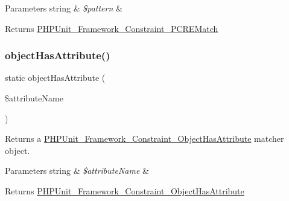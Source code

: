 \begin{DoxyParams}[1]{Parameters}
string & {\em \$pattern} & \\
\hline
\end{DoxyParams}
\begin{DoxyReturn}{Returns}
\mbox{\hyperlink{class_p_h_p_unit___framework___constraint___p_c_r_e_match}{P\+H\+P\+Unit\+\_\+\+Framework\+\_\+\+Constraint\+\_\+\+P\+C\+R\+E\+Match}} 
\end{DoxyReturn}
\mbox{\label{class_p_h_p_unit___framework___assert_a628f4db99294a237d96c432937bd1dfe}} 
\subsubsection{\texorpdfstring{object\+Has\+Attribute()}{objectHasAttribute()}}
{\footnotesize\ttfamily static object\+Has\+Attribute (\begin{DoxyParamCaption}\item[{}]{\$attribute\+Name }\end{DoxyParamCaption})\hspace{0.3cm}{\ttfamily [static]}}

Returns a \mbox{\hyperlink{class_p_h_p_unit___framework___constraint___object_has_attribute}{P\+H\+P\+Unit\+\_\+\+Framework\+\_\+\+Constraint\+\_\+\+Object\+Has\+Attribute}} matcher object.


\begin{DoxyParams}[1]{Parameters}
string & {\em \$attribute\+Name} & \\
\hline
\end{DoxyParams}
\begin{DoxyReturn}{Returns}
\mbox{\hyperlink{class_p_h_p_unit___framework___constraint___object_has_attribute}{P\+H\+P\+Unit\+\_\+\+Framework\+\_\+\+Constraint\+\_\+\+Object\+Has\+Attribute}} 
\end{DoxyReturn}
\mbox{\label{class_p_h_p_unit___framework___assert_abe109d13ee5ea79ded6ddd4942764cb3}} 
